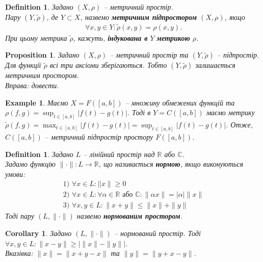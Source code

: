 \documentclass[a4paper, 10pt]{article}
\theoremstyle{theoremdd}
\theoremstyle{theoremdd}
\newtheorem{definition}[theorem]{Definition}
\theoremstyle{theoremdd}
\theoremstyle{theoremdd}
\newtheorem{example}[theorem]{Example}
\theoremstyle{theoremdd}
\newtheorem{proposition}[theorem]{Proposition}
\theoremstyle{theoremdd}
\theoremstyle{theoremdd}
\theoremstyle{theoremdd}
\newtheorem{corollary}[theorem]{Corollary}
\begin{document}
\begin{definition}
Задано $(X,\rho)$ -- метричний простір.\\
Пару $(Y,\tilde{\rho})$, де $Y \subset X$, назвемо \textbf{метричним підпростором} $(X,\rho)$, якщо
\begin{align*}
\forall x,y \in Y: \tilde{\rho}(x,y) = \rho(x,y).
\end{align*}
При цьому метрика $\tilde{\rho}$, кажуть, \textbf{індукована в} $Y$ \textbf{метрикою} $\rho$.
\end{definition}

\begin{proposition}
Задано $(X,\rho)$ -- метричний простір та $(Y,\tilde{\rho})$ -- підпростір. Для функції $\tilde{\rho}$ всі три аксіоми зберігаються. Тобто $(Y,\tilde{\rho})$ залишається метричним простором.\\
\textit{Вправа: довести.}
\end{proposition}

\begin{example}
Маємо $X = F([a,b])$ -- множину обмежених функцій та $\rho(f,g) = \displaystyle \sup_{t \in [a,b]} |f(t)-g(t)|$. Тоді в $Y = C([a,b])$ маємо метрику $\tilde{\rho}(f,g) = \displaystyle \max_{t \in [a,b]} |f(t)-g(t)| = \displaystyle \sup_{t \in [a,b]} |f(t)-g(t)|$. Отже, $C([a,b])$ -- метричний підпростір простору $F([a,b])$.
\end{example}

\begin{definition}
Задано $L$ -- лінійний простір над $\mathbb{R}$ або $\mathbb{C}$.\\
Задамо функцію $\| \cdot \|: L \to \mathbb{R}$, що називається \textbf{нормою}, якщо виконуються умови:
\begin{align*}
\text{1) } \forall x \in L: ||x\| \geq 0 \\
\text{2) } \forall x \in L: \forall \alpha \in \mathbb{R} \text{ або } \mathbb{C}: \|\alpha x\| = |\alpha| \|x\| \\
\text{3) } \forall x,y \in L: \|x+y\| \leq \|x\| + \|y\|
\end{align*}
Тоді пару $(L, \|\cdot \|)$ назвемо \textbf{нормованим простором}.
\end{definition}

\begin{corollary}
Задано $(L, \| \cdot \|)$ -- нормований простір. Тоді $\forall x,y \in L: \|x-y\| \geq \left| \|x\| - \|y\| \right|$.\\
\textit{Вказівка: $\|x\| = \|x + y - x\|$ та $\|y\| = \|y + x -y \|$.}
\end{corollary}
\end{document}
